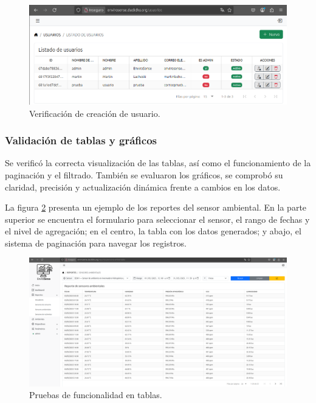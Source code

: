 \begin{figure}[H]
    \centering
    \includegraphics[width=\textwidth]{Images/44_formulario_verificacion.png}
    \caption[Verificación de creación de usuario]{Verificación de creación de usuario.}
    \label{fig:verificacion_formulario}
\end{figure}

\subsubsection{Validación de tablas y gráficos}

Se verificó la correcta visualización de las tablas, así como el funcionamiento
de la paginación y el filtrado. También se evaluaron los gráficos, se comprobó
su claridad, precisión y actualización dinámica frente a cambios en los datos.

La figura \ref{fig:tabla} presenta un ejemplo de los reportes del sensor
ambiental. En la parte superior se encuentra el formulario para seleccionar
el sensor, el rango de fechas y el nivel de agregación; en el centro, la tabla con los
datos generados; y abajo, el sistema de paginación para navegar los registros.

\begin{figure}[H]
    \centering
    \includegraphics[width=\textwidth]{Images/45_tabla.png}
    \caption[Pruebas de funcionalidad en tablas]{Pruebas de funcionalidad en tablas.}
    \label{fig:tabla}
\end{figure}

